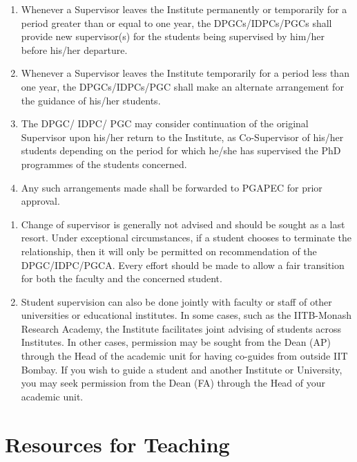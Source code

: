 \documentclass[
  10pt,
  a5paper,
  10pt,
  openany]{amsbook}
\providecommand{\tightlist}{%
  \setlength{\itemsep}{0pt}\setlength{\parskip}{0pt}}
\begin{document}
\begin{enumerate}
\def\labelenumi{\alph{enumi}.}
\tightlist
\item
  Whenever a Supervisor leaves the Institute permanently or temporarily
  for a period greater than or equal to one year, the DPGCs/IDPCs/PGCs
  shall provide new supervisor(s) for the students being supervised by
  him/her before his/her departure.
\item
  Whenever a Supervisor leaves the Institute temporarily for a period
  less than one year, the DPGCs/IDPCs/PGC shall make an alternate
  arrangement for the guidance of his/her students.
\item
  The DPGC/ IDPC/ PGC may consider continuation of the original
  Supervisor upon his/her return to the Institute, as Co-Supervisor of
  his/her students depending on the period for which he/she has
  supervised the PhD programmes of the students concerned.
\item
  Any such arrangements made shall be forwarded to PGAPEC for prior
  approval.
\end{enumerate}

\begin{enumerate}
\def\labelenumi{\arabic{enumi}.}
\setcounter{enumi}{6}
\tightlist
\item
  Change of supervisor is generally not advised and should be sought as
  a last resort. Under exceptional circumstances, if a student chooses
  to terminate the relationship, then it will only be permitted on
  recommendation of the DPGC/IDPC/PGCA. Every effort should be made to
  allow a fair transition for both the faculty and the concerned
  student.
\item
  Student supervision can also be done jointly with faculty or staff of
  other universities or educational institutes. In some cases, such as
  the IITB-Monash Research Academy, the Institute facilitates joint
  advising of students across Institutes. In other cases, permission may
  be sought from the Dean (AP) through the Head of the academic unit for
  having co-guides from outside IIT Bombay. If you wish to guide a
  student and another Institute or University, you may seek permission
  from the Dean (FA) through the Head of your academic unit.
\end{enumerate}

\chapter{Resources for Teaching}\label{sec:teachingresources}
\end{document}
